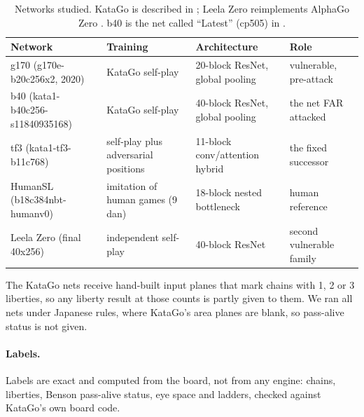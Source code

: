 \documentclass[11pt]{article}
\begin{document}
\begin{table}[h]
\centering\small
\begin{tabular}{@{}L{4.4cm}L{3.6cm}L{3.6cm}L{3.2cm}@{}}
\toprule
Network & Training & Architecture & Role \\
\midrule
g170 (g170e-b20c256x2, 2020) & KataGo self-play & 20-block ResNet, global pooling & vulnerable, pre-attack \\
b40 (kata1-b40c256-s11840935168) & KataGo self-play & 40-block ResNet, global pooling & the net FAR attacked \\
tf3 (kata1-tf3-b11c768) & self-play plus adversarial positions & 11-block conv/attention hybrid & the fixed successor \\
HumanSL (b18c384nbt-humanv0) & imitation of human games (9 dan) & 18-block nested bottleneck & human reference \\
Leela Zero (final 40x256) & independent self-play & 40-block ResNet & second vulnerable family \\
\bottomrule
\end{tabular}
\caption{Networks studied. KataGo is described in \citet{wu2019accelerating}; Leela Zero \citep{leelazero} reimplements AlphaGo Zero \citep{silver2017mastering}. b40 is the net called ``Latest'' (cp505) in \citet{wang2023adversarial}.}
\label{tab:nets}
\end{table}

The KataGo nets receive hand-built input planes that mark chains with 1, 2 or 3 liberties, so any liberty result at those counts is partly given to them. We ran all nets under Japanese rules, where KataGo's area planes are blank, so pass-alive status is not given.

\paragraph{Labels.} Labels are exact and computed from the board, not from any engine: chains, liberties, Benson pass-alive status, eye space and ladders, checked against KataGo's own board code.
\end{document}

